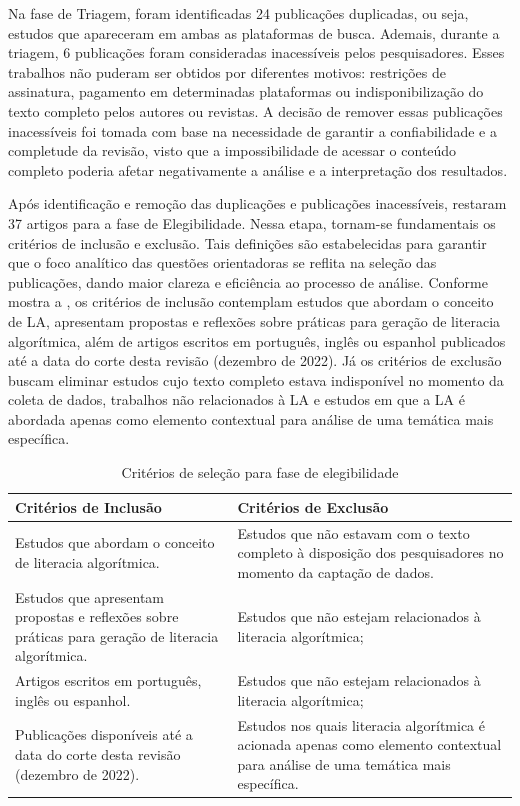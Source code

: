 Na fase de Triagem, foram identificadas 24 publicações duplicadas, ou
seja, estudos que apareceram em ambas as plataformas de busca. Ademais,
durante a triagem, 6 publicações foram consideradas inacessíveis pelos
pesquisadores. Esses trabalhos não puderam ser obtidos por diferentes
motivos: restrições de assinatura, pagamento em determinadas plataformas
ou indisponibilização do texto completo pelos autores ou revistas. A
decisão de remover essas publicações inacessíveis foi tomada com base na
necessidade de garantir a confiabilidade e a completude da revisão,
visto que a impossibilidade de acessar o conteúdo completo poderia
afetar negativamente a análise e a interpretação dos resultados.

Após identificação e remoção das duplicações e publicações inacessíveis,
restaram 37 artigos para a fase de Elegibilidade. Nessa etapa, tornam-se
fundamentais os critérios de inclusão e exclusão. Tais definições são
estabelecidas para garantir que o foco analítico das questões
orientadoras se reflita na seleção das publicações, dando maior clareza
e eficiência ao processo de análise. Conforme mostra a , os
critérios de inclusão contemplam estudos que abordam o conceito de LA,
apresentam propostas e reflexões sobre práticas para geração de
literacia algorítmica, além de artigos escritos em português, inglês ou
espanhol publicados até a data do corte desta revisão (dezembro de
2022). Já os critérios de exclusão buscam eliminar estudos cujo texto
completo estava indisponível no momento da coleta de dados, trabalhos
não relacionados à LA e estudos em que a LA é abordada apenas como
elemento contextual para análise de uma temática mais específica.

   
\begin{table}[!htpb]
\centering
\begin{threeparttable}
\caption{Critérios de seleção para fase de elegibilidade}
\label{tab-02}
\begin{tabular}{p{} p{}}
\toprule
Critérios de Inclusão & Critérios de Exclusão \\
\midrule
Estudos que abordam o conceito de literacia algorítmica. & Estudos que não estavam com o texto completo à disposição dos pesquisadores no momento da captação de dados.\\
Estudos que apresentam propostas e reflexões sobre práticas para geração de literacia algorítmica. & Estudos que não estejam relacionados à literacia algorítmica;\\
Artigos escritos em português, inglês ou espanhol. & Estudos que não estejam relacionados à literacia algorítmica;\\
Publicações disponíveis até a data do corte desta revisão (dezembro de 2022). & Estudos nos quais literacia algorítmica é acionada apenas como elemento contextual para análise de uma temática mais específica.\\
\bottomrule
\end{tabular}
\end{threeparttable}
\end{table}   


